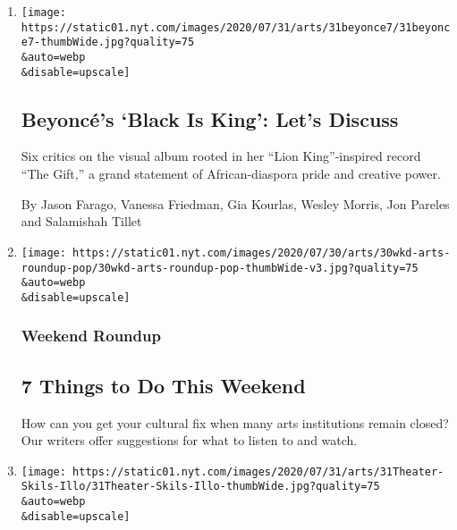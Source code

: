 \begin{enumerate}
\def\labelenumi{\arabic{enumi}.}
\item
  \href{/2020/07/31/arts/music/beyonce-black-is-king.html}{}

  \texttt{[image: https://static01.nyt.com/images/2020/07/31/arts/31beyonce7/31beyonce7-thumbWide.jpg?quality=75\\\&auto=webp\\\&disable=upscale]}

  \hypertarget{beyoncuxe9s-black-is-king-lets-discuss}{%
  \subsection{Beyoncé's `Black Is King': Let's
  Discuss}\label{beyoncuxe9s-black-is-king-lets-discuss}}

  Six critics on the visual album rooted in her ``Lion King''-inspired
  record ``The Gift,'' a grand statement of African-diaspora pride and
  creative power.

  By Jason Farago, Vanessa Friedman, Gia Kourlas, Wesley Morris, Jon
  Pareles and Salamishah Tillet
\item
  \href{/2020/07/30/arts/things-to-do-weekend-coronavirus.html}{}

  \texttt{[image: https://static01.nyt.com/images/2020/07/30/arts/30wkd-arts-roundup-pop/30wkd-arts-roundup-pop-thumbWide-v3.jpg?quality=75\\\&auto=webp\\\&disable=upscale]}

  \hypertarget{weekend-roundup}{%
  \subsubsection{Weekend Roundup}\label{weekend-roundup}}

  \hypertarget{7-things-to-do-this-weekend}{%
  \subsection{7 Things to Do This
  Weekend}\label{7-things-to-do-this-weekend}}

  How can you get your cultural fix when many arts institutions remain
  closed? Our writers offer suggestions for what to listen to and watch.
\item
  \href{/2020/07/30/theater/theater-classes-at-home.html}{}

  \texttt{[image: https://static01.nyt.com/images/2020/07/31/arts/31Theater-Skils-Illo/31Theater-Skils-Illo-thumbWide.jpg?quality=75\\\&auto=webp\\\&disable=upscale]}

  \hypertarget{how-i-spent-my-summer-vacation-singing-dancing-knife-fighting}{%
}
\end{enumerate}
